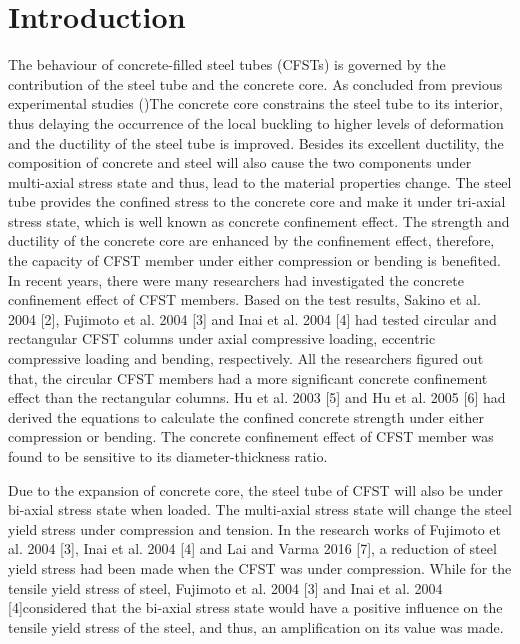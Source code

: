 \documentclass[12pt, A4]{article}
\begin{document}
	\section{Introduction}
	The behaviour of concrete-filled steel tubes (CFSTs) is governed by the contribution of the steel tube and the concrete core. As concluded from previous experimental studies (\cite{})The concrete core constrains the steel tube to its interior, thus delaying the occurrence of the local buckling to higher levels of deformation and the ductility of the steel tube is improved. Besides its excellent ductility, the composition of concrete and steel will also cause the two components under multi-axial stress state and thus, lead to the material properties change. The steel tube provides the confined stress to the concrete core and make it under tri-axial stress state, which is well known as concrete confinement effect. The strength and ductility of the concrete core are enhanced by the confinement effect, therefore, the capacity of CFST member under either compression or bending is benefited. In recent years, there were many researchers had investigated the concrete confinement effect of CFST members. Based on the test results, Sakino et al. 2004 [2], Fujimoto et al. 2004 [3] and Inai et al. 2004 [4] had tested circular and rectangular CFST columns under axial compressive loading, eccentric compressive loading and bending, respectively. All the researchers figured out that, the circular CFST members had a more significant concrete confinement effect than the rectangular columns. Hu et al. 2003 [5] and Hu et al. 2005 [6] had derived the equations to calculate the confined concrete strength under either compression or bending. The concrete confinement effect of CFST member was found to be sensitive to its diameter-thickness ratio.
	\par	
	Due to the expansion of concrete core, the steel tube of CFST will also be under bi-axial stress state when loaded. The multi-axial stress state will change the steel yield stress under compression and tension. In the research works of Fujimoto et al. 2004 [3], Inai et al. 2004 [4] and Lai and Varma 2016 [7], a reduction of steel yield stress had been made when the CFST was under compression. While for the tensile yield stress of steel, Fujimoto et al. 2004 [3] and Inai et al. 2004 [4]considered that the bi-axial stress state would have a positive influence on the tensile yield stress of the steel, and thus, an amplification on its value was made.
\end{document}
